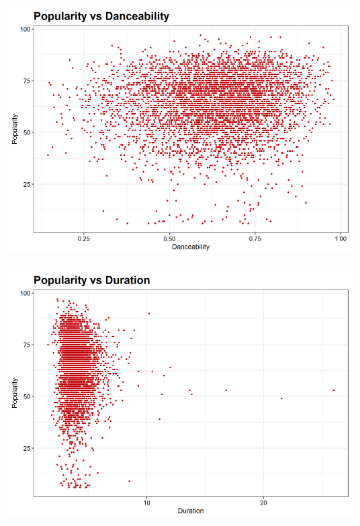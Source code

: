\documentclass[12pt, twoside]{article}
\begin{document}
\begin{figure}[H]
\begin{subfigure}[b]{0.5\textwidth}
\includegraphics[width = \textwidth]{pop_vs_track_danceability.png}
\caption{}
\label{fig:loudness_trend}
\end{subfigure}
\begin{subfigure}[b]{0.5\textwidth}
\centering
\includegraphics[width = \textwidth]{pop_vs_track_duration.png}
\caption{}
\label{fig:duration_trend}
\end{subfigure}
\end{figure}
\end{document}
